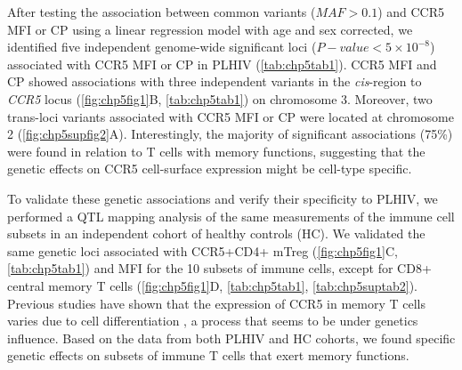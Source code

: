 \documentclass{book}
\begin{document}
\begin{refsection}
After testing the association between common variants ($MAF > 0.1$) and CCR5 MFI or CP using a linear regression model with age and sex corrected, we identified five independent genome-wide significant loci ($P-value < 5 \times 10^{-8}$) associated with CCR5 MFI or CP in PLHIV (\ref{tab:chp5tab1}).
CCR5 MFI and CP showed associations with three independent variants in the \textit{cis}-region to \textit{CCR5} locus (\ref{fig:chp5fig1}B, \ref{tab:chp5tab1}) on chromosome 3.
Moreover, two trans-loci variants associated with CCR5 MFI or CP were located at chromosome 2 (\ref{fig:chp5supfig2}A).
Interestingly, the majority of significant associations (75\%) were found in relation to T cells with memory functions, suggesting that the genetic effects on CCR5 cell-surface expression might be cell-type specific.

To validate these genetic associations and verify their specificity to PLHIV, we performed a QTL mapping analysis of the same measurements of the immune cell subsets in an independent cohort of healthy controls (HC).
We validated the same genetic loci associated with CCR5+CD4+ mTreg (\ref{fig:chp5fig1}C, \ref{tab:chp5tab1}) and MFI for the 10 subsets of immune cells, except for CD8+ central memory T cells (\ref{fig:chp5fig1}D, \ref{tab:chp5tab1}, \ref{tab:chp5suptab2}).
Previous studies have shown that the expression of CCR5 in memory T cells varies due to cell differentiation \cite{Lee1999Quantification}, a process that seems to be under genetics influence.%
Based on the data from both PLHIV and HC cohorts, we found specific genetic effects on subsets of immune T cells that exert memory functions.


\end{refsection}
\end{document}
